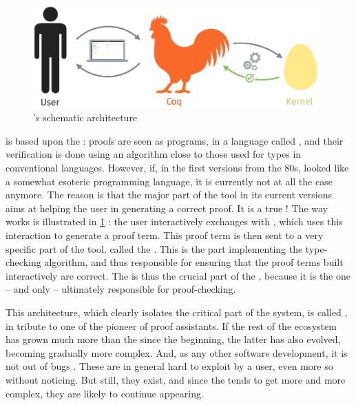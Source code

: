 \begin{figure}[h]

  \centering
  \includegraphics{./figures/coq-kernel-en.pdf}

  \caption{’s schematic architecture}
  \label{fig:coq-en}
\end{figure}

 is based upon the : proofs are seen as programs,
in a language called , and their verification is done using an algorithm
close to those used for types in conventional languages. However, if, in the first versions
from the 80s,  looked like a somewhat esoteric programming language, it is
currently not at all the case anymore. The reason is that the major part of the tool in its
current versions aims at helping the user in generating a correct proof. It is a true
!
The way  works is illustrated in \cref{fig:coq-en} : the user interactively exchanges
with , which uses this interaction to generate a proof term. This proof term is then
sent to a very specific part of the tool, called the .
This is the part implementing the type-checking algorithm, and thus responsible for ensuring
that the proof terms built interactively are correct.
The  is thus the crucial part of the , because it is the one – and only –
ultimately responsible for proof-checking.

This architecture, which clearly isolates the critical part of the system, is called
 , in tribute to one of the pioneer
of proof assistants.
If the rest of the ecosystem has grown much more than the  since the beginning,
the latter has also evolved, becoming gradually more complex.
And, as any other software development, it is not out of bugs%
.
These are in general hard to exploit by a user, even more so without noticing.
But still, they exist, and since the  tends to get more and more complex, they
are likely to continue appearing.

